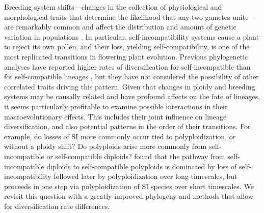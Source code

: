 Breeding system shifts---changes in the collection of physiological and morphological traits that determine the likelihood that any two gametes unite---are remarkably common and affect the distribution and amount of genetic variation in populations \citep{stebbins1974, barrett2013}.
In particular, self-incompatibility systems cause a plant to reject its own pollen, and their loss, yielding self-compatibility, is one of the most replicated transitions in flowering plant evolution. %
Previous phylogenetic analyses have reported higher rates of diversification for self-incompatible than for self-compatible lineages \citep{goldberg_2010, devos2014}, but they have not considered the possibility of other correlated traits driving this pattern.
Given that changes in ploidy and breeding systems may be causally related and have profound affects on the fate of lineages, it seems particularly profitable to examine possible interactions in their macroevolutionary effects.
This includes their joint influence on lineage diversification, and also potential patterns in the order of their transitions.
For example, do losses of SI more commonly occur tied to polyploidization, or without a ploidy shift?
Do polyploids arise more commonly from self-incompatible or self-compatible diploids?
 found that the pathway from self-incompatible diploids to self-compatible polyploids is dominated by loss of self-incompatibility followed later by polyploidization over long timescales, but proceeds in one step via polyploidization of SI species over short timescales.
We revisit this question with a greatly improved phylogeny and methods that allow for diversification rate differences. %

